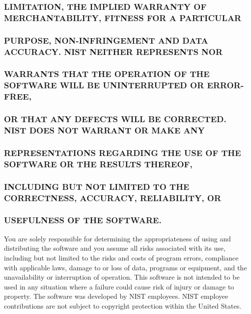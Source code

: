 \subsubsection*{L\+I\+M\+I\+T\+A\+T\+I\+ON, T\+HE I\+M\+P\+L\+I\+ED W\+A\+R\+R\+A\+N\+TY OF M\+E\+R\+C\+H\+A\+N\+T\+A\+B\+I\+L\+I\+TY, F\+I\+T\+N\+E\+SS F\+OR A P\+A\+R\+T\+I\+C\+U\+L\+AR}

\subsubsection*{P\+U\+R\+P\+O\+SE, N\+O\+N-\/\+I\+N\+F\+R\+I\+N\+G\+E\+M\+E\+NT A\+ND D\+A\+TA A\+C\+C\+U\+R\+A\+CY. N\+I\+ST N\+E\+I\+T\+H\+ER R\+E\+P\+R\+E\+S\+E\+N\+TS N\+OR}

\subsubsection*{W\+A\+R\+R\+A\+N\+TS T\+H\+AT T\+HE O\+P\+E\+R\+A\+T\+I\+ON OF T\+HE S\+O\+F\+T\+W\+A\+RE W\+I\+LL BE U\+N\+I\+N\+T\+E\+R\+R\+U\+P\+T\+ED OR E\+R\+R\+O\+R-\/\+F\+R\+EE,}

\subsubsection*{OR T\+H\+AT A\+NY D\+E\+F\+E\+C\+TS W\+I\+LL BE C\+O\+R\+R\+E\+C\+T\+ED. N\+I\+ST D\+O\+ES N\+OT W\+A\+R\+R\+A\+NT OR M\+A\+KE A\+NY}

\subsubsection*{R\+E\+P\+R\+E\+S\+E\+N\+T\+A\+T\+I\+O\+NS R\+E\+G\+A\+R\+D\+I\+NG T\+HE U\+SE OF T\+HE S\+O\+F\+T\+W\+A\+RE OR T\+HE R\+E\+S\+U\+L\+TS T\+H\+E\+R\+E\+OF,}

\subsubsection*{I\+N\+C\+L\+U\+D\+I\+NG B\+UT N\+OT L\+I\+M\+I\+T\+ED TO T\+HE C\+O\+R\+R\+E\+C\+T\+N\+E\+SS, A\+C\+C\+U\+R\+A\+CY, R\+E\+L\+I\+A\+B\+I\+L\+I\+TY, OR}

\subsubsection*{U\+S\+E\+F\+U\+L\+N\+E\+SS OF T\+HE S\+O\+F\+T\+W\+A\+RE.}

You are solely responsible for determining the appropriateness of using and distributing the software and you assume all risks associated with its use, including but not limited to the risks and costs of program errors, compliance with applicable laws, damage to or loss of data, programs or equipment, and the unavailability or interruption of operation. This software is not intended to be used in any situation where a failure could cause risk of injury or damage to property. The software was developed by N\+I\+ST employees. N\+I\+ST employee contributions are not subject to copyright protection within the United States. 

